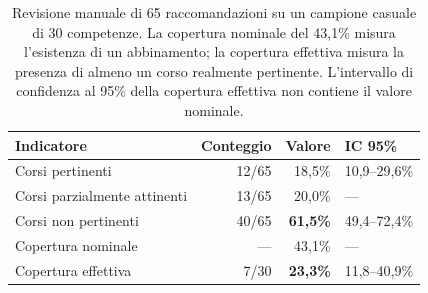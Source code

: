 \begin{table}[htbp]
  \centering
  \caption{Revisione manuale di 65 raccomandazioni su un campione casuale di 30
           competenze. La copertura nominale del 43,1\% misura l'esistenza di un
           abbinamento; la copertura effettiva misura la presenza di almeno un
           corso realmente pertinente. L'intervallo di confidenza al 95\% della
           copertura effettiva non contiene il valore nominale.}
  \label{tab:revisione-corsi}
  \begin{tabular}{lrrl}
    \toprule
    \textbf{Indicatore} & \textbf{Conteggio} & \textbf{Valore}
      & \textbf{IC 95\%} \\
    \midrule
    Corsi pertinenti          & 12/65 & 18,5\% & 10,9--29,6\% \\
    Corsi parzialmente attinenti & 13/65 & 20,0\% & --- \\
    Corsi non pertinenti      & 40/65 & \textbf{61,5\%} & 49,4--72,4\% \\
    \midrule
    Copertura nominale        & ---   & 43,1\% & --- \\
    Copertura effettiva       & 7/30  & \textbf{23,3\%} & 11,8--40,9\% \\
    \bottomrule
  \end{tabular}
\end{table}

